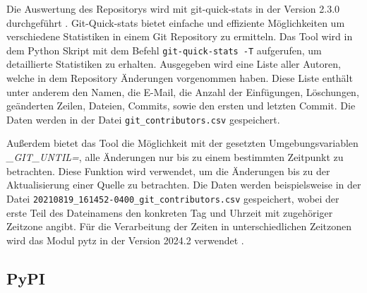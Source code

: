 Die Auswertung des Repositorys wird mit git-quick-stats in der Version 2.3.0 durchgeführt \autocite{arzzen_git-quick-statsgit-quick-stats_2021}.
Git-Quick-stats bietet einfache und effiziente Möglichkeiten um verschiedene Statistiken in einem Git Repository zu ermitteln.
Das Tool wird in dem Python Skript mit dem Befehl \texttt{git-quick-stats -T} aufgerufen, um detaillierte Statistiken zu erhalten.
Ausgegeben wird eine Liste aller Autoren, welche in dem Repository Änderungen vorgenommen haben.
Diese Liste enthält unter anderem den Namen, die E-Mail, die Anzahl der Einfügungen, Löschungen, geänderten Zeilen, Dateien, Commits, sowie den ersten und letzten Commit.
Die Daten werden in der Datei \texttt{git\_contributors.csv} gespeichert.

Außerdem bietet das Tool die Möglichkeit mit der gesetzten Umgebungsvariablen \textit{\_GIT\_UNTIL=}, alle Änderungen nur bis zu einem bestimmten Zeitpunkt zu betrachten.
Diese Funktion wird verwendet, um die Änderungen bis zu der Aktualisierung einer Quelle zu betrachten.
Die Daten werden beispielsweise in der Datei \texttt{20210819\_161452-0400\_git\_contributors.csv} gespeichert, wobei der erste Teil des Dateinamens den konkreten Tag und Uhrzeit mit zugehöriger Zeitzone angibt.
Für die Verarbeitung der Zeiten in unterschiedlichen Zeitzonen wird das Modul pytz in der Version 2024.2 verwendet \autocite{bishop_stub42pytz_2024}.

\subsection{PyPI} %
\label{subsec:datenbeschaffung_pypi}

